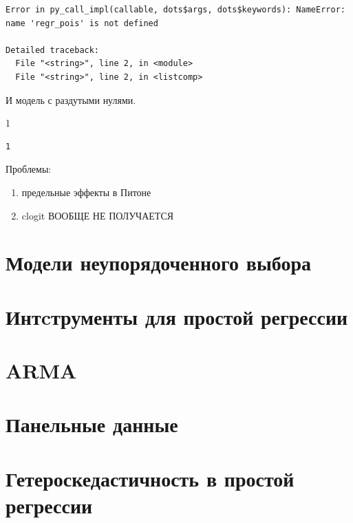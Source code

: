 \documentclass[]{book}
\newenvironment{Shaded}{\begin{snugshade}}{\end{snugshade}}
\newcommand{\DecValTok}[1]{\textcolor[rgb]{0.00,0.00,0.81}{#1}}
\providecommand{\tightlist}{%
  \setlength{\itemsep}{0pt}\setlength{\parskip}{0pt}}
\begin{document}
\begin{verbatim}
Error in py_call_impl(callable, dots$args, dots$keywords): NameError: name 'regr_pois' is not defined

Detailed traceback: 
  File "<string>", line 2, in <module>
  File "<string>", line 2, in <listcomp>
\end{verbatim}

И модель с раздутыми нулями.

\begin{Shaded}
\begin{Highlighting}[]
\DecValTok{1}
\end{Highlighting}
\end{Shaded}

\begin{verbatim}
1
\end{verbatim}

Проблемы:

\begin{enumerate}
\def\labelenumi{\arabic{enumi})}
\setcounter{enumi}{1}
\tightlist
\item
  предельные эффекты в Питоне
\item
  clogit ВООБЩЕ НЕ ПОЛУЧАЕТСЯ
\end{enumerate}

\hypertarget{disordered}{%
\chapter{Модели неупорядоченного выбора}\label{disordered}}

\hypertarget{instruments}{%
\chapter{Интcтрументы для простой регрессии}\label{instruments}}

\hypertarget{arma}{%
\chapter{ARMA}\label{arma}}

\hypertarget{paneldata}{%
\chapter{Панельные данные}\label{paneldata}}

\hypertarget{heterosked}{%
\chapter{Гетероскедастичность в простой регрессии}\label{heterosked}}
\end{document}
